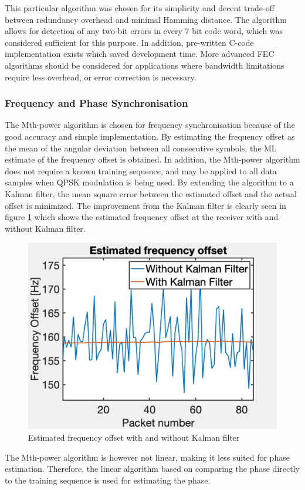 This particular algorithm was chosen for its simplicity and decent trade-off between redundancy overhead and minimal Hamming distance. The algorithm allows for detection of any two-bit errors in every 7 bit code word, which was considered sufficient for this purpose. In addition, pre-written C-code implementation exists \cite{hamming} which saved development time. More advanced FEC algorithms should be considered for applications where bandwidth limitations require less overhead, or error correction is necessary. 

\subsubsection{Frequency and Phase Synchronisation}
The Mth-power algorithm is chosen for frequency synchronisation because of the good accuracy and simple implementation. By estimating the frequency offset as the mean of the angular deviation between all consecutive symbols, the ML estimate of the frequency offset is obtained. In addition, the Mth-power algorithm does not require a known training sequence, and may be applied to all data samples when QPSK modulation is being used. By extending the algorithm to a Kalman filter, the mean square error between the estimated offset and the actual offset is minimized. The improvement from the Kalman filter is clearly seen in figure \ref{fig:kalman_freq} which shows the estimated frequency offset at the receiver with and without Kalman filter.

\begin{figure}[htbp]
\centering
\includegraphics[width=\figW\linewidth]{KalmanFreq.png}
\caption{Estimated frequency offset with and without Kalman filter}
\label{fig:kalman_freq}

\end{figure}

The Mth-power algorithm is however not linear, making it less suited for phase estimation. Therefore, the linear algorithm based on comparing the phase directly to the training sequence is used for estimating the phase.
 





